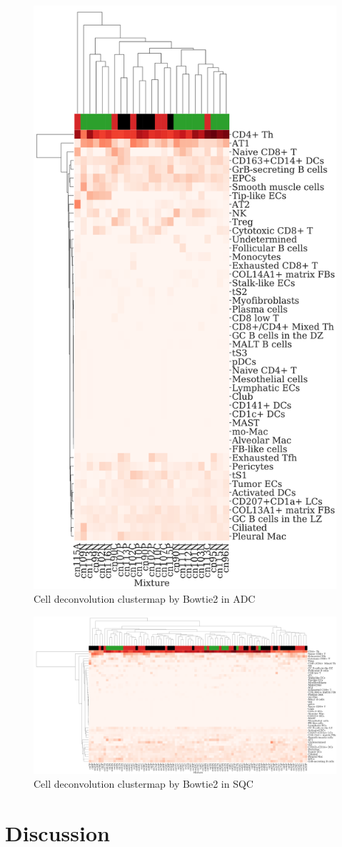 \documentclass[a4paper]{article}
\begin{document}
            \begin{figure}[htbp]
                \centering
                \includegraphics[width=0.4 \linewidth]{figures/CIBERSORTx/clustermap/ADC.Bowtie2.cluster.pdf}
                \caption{Cell deconvolution clustermap by Bowtie2 in ADC}
                \label{fig:Deconvolution-Bowtie2-cluster-ADC}
            \end{figure}

            \begin{figure}[htbp]
                \centering
                \includegraphics[width=\linewidth]{figures/CIBERSORTx/clustermap/SQC.Bowtie2.cluster.pdf}
                \caption{Cell deconvolution clustermap by Bowtie2 in SQC}
                \label{fig:Deconvolution-Bowtie2-cluster-SQC}
            \end{figure}

    \section{Discussion}

    
    
\end{document}
